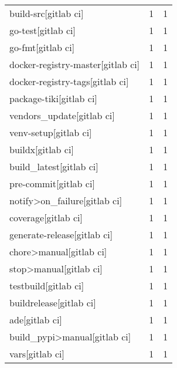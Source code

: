 \begin{tabular}{lrr}
build-src[gitlab ci]                       &                   1 &             1 \\
go-test[gitlab ci]                         &                   1 &             1 \\
go-fmt[gitlab ci]                          &                   1 &             1 \\
docker-registry-master[gitlab ci]          &                   1 &             1 \\
docker-registry-tags[gitlab ci]            &                   1 &             1 \\
package-tiki[gitlab ci]                    &                   1 &             1 \\
vendors\_update[gitlab ci]                  &                   1 &             1 \\
venv-setup[gitlab ci]                      &                   1 &             1 \\
buildx[gitlab ci]                          &                   1 &             1 \\
build\_latest[gitlab ci]                    &                   1 &             1 \\
pre-commit[gitlab ci]                      &                   1 &             1 \\
notify>on\_failure[gitlab ci]               &                   1 &             1 \\
coverage[gitlab ci]                        &                   1 &             1 \\
generate-release[gitlab ci]                &                   1 &             1 \\
chore>manual[gitlab ci]                    &                   1 &             1 \\
stop>manual[gitlab ci]                     &                   1 &             1 \\
testbuild[gitlab ci]                       &                   1 &             1 \\
buildrelease[gitlab ci]                    &                   1 &             1 \\
ade[gitlab ci]                             &                   1 &             1 \\
build\_pypi>manual[gitlab ci]               &                   1 &             1 \\
vars[gitlab ci]                            &                   1 &             1 \\

\end{tabular}
